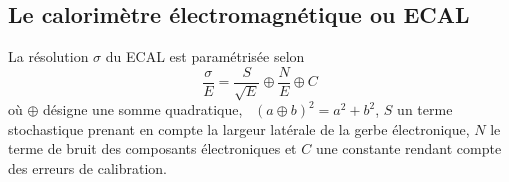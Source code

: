 \subsection{Le calorimètre électromagnétique ou ECAL}\label{chapter-LHC-section-CMS-subsec-ECAL}
\cite{cms_paper,CERN-LHCC-97-033}


La résolution $\sigma$ du ECAL est paramétrisée selon
\begin{equation}
\frac{\sigma}{E}
=
\frac{S}{\sqrt{E}}
\oplus
\frac{N}{E}
\oplus
C
\end{equation}
où $\oplus$ désigne une somme quadratique, \ie\ $(a\oplus b)^2 = a^2 + b^2$,
$S$ un terme stochastique prenant en compte la largeur latérale de la gerbe électronique,
$N$ le terme de bruit des composants électroniques et
$C$ une constante rendant compte des erreurs de calibration.
